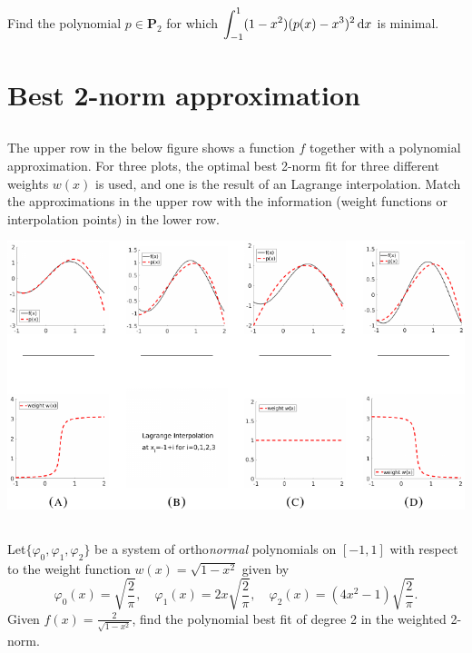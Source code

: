 \documentclass[11pt,letterpaper]{article}
\begin{document}
\subsection{}
Find the polynomial $p \in \boldsymbol P_2$ for which
    $\displaystyle \int_{-1}^1 (1-x^2)(p(x) - x^3)^2 \, \mathrm{d} x$ is minimal.


\section{Best 2-norm approximation}
\subsection{} 
The upper row in the below figure shows a function $f$ together with a polynomial approximation. For three plots, the
      optimal best 2-norm fit for three different weights $w(x)$ is
      used, and one is the result of an Lagrange interpolation. Match
      the approximations in the upper row with the information (weight
      functions or interpolation points) in the lower row.
      \begin{center}
        \includegraphics[width=.9\textwidth]{bestL2}
      \end{center}
\subsection{} 
Let$\{\varphi_0, \varphi_1, \varphi_2\}$ be a system of
      ortho\textit{normal} polynomials on $[-1,1]$ with respect to the
      weight function $w(x)=\sqrt{1-x^2}$ given by
      \[ \varphi_0(x)=\sqrt{\frac{2}{\pi}},\quad
      \varphi_1(x)=2x\sqrt{\frac{2}{\pi}}, \quad
      \varphi_2(x)=(4x^2-1)\sqrt{\frac{2}{\pi}}.
      \]
      Given $f(x)=\frac{2}{\sqrt{1-x^2}}$, find the polynomial best fit of
      degree 2 in the weighted 2-norm.



\vfill
\printbibliography
\end{document}
